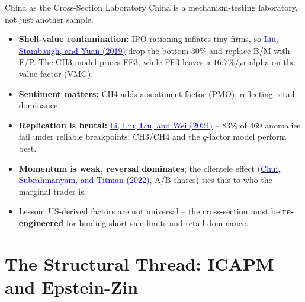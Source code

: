 \documentclass{beamer}
\begin{document}
\begin{frame}{China as the Cross-Section Laboratory}
China is a \alert{mechanism-testing laboratory}, not just another sample.
\begin{itemize}
  \item \textbf{Shell-value contamination:} IPO rationing inflates tiny firms, so \href{https://doi.org/10.1016/j.jfineco.2019.03.008}{\textcolor{blue}{Liu, Stambaugh, and Yuan (2019)}} drop the bottom 30\% and replace B/M with E/P. The \alert{CH3} model prices FF3, while FF3 leaves a $16.7\%$/yr alpha on the value factor (VMG).
  \item \textbf{Sentiment matters:} CH4 adds a sentiment factor (PMO), reflecting retail dominance.
  \item \textbf{Replication is brutal:} \href{https://doi.org/10.1287/mnsc.2023.4904}{\textcolor{blue}{Li, Liu, Liu, and Wei (2024)}} -- $83\%$ of 469 anomalies fail under reliable breakpoints; CH3/CH4 and the $q$-factor model perform best.
  \item \textbf{Momentum is weak, reversal dominates}; the clientele effect (\href{https://doi.org/10.1093/rof/rfac010}{\textcolor{blue}{Chui, Subrahmanyam, and Titman (2022)}}, A/B shares) ties this to who the marginal trader is.
  \item \alert{Lesson:} US-derived factors are not universal -- the cross-section must be \textbf{re-engineered} for binding short-sale limits and retail dominance.
\end{itemize}
\end{frame}

\section{The Structural Thread: ICAPM and Epstein-Zin}
\end{document}
